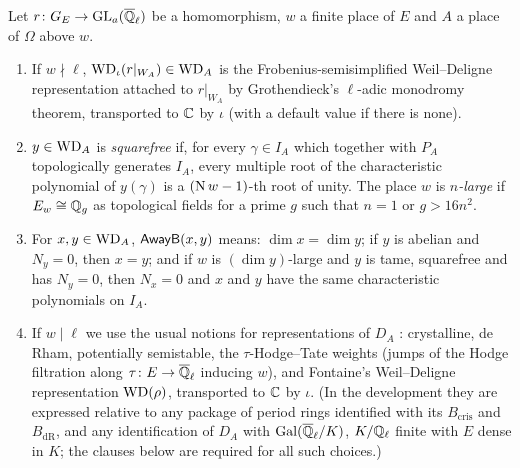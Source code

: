 \begin{definition}\label{def:galois:awayb}
Let $r\colon G_E\to\operatorname{GL}_a(\overline{\mathbb{Q}}_\ell)$ be a homomorphism, $w$ a finite place of $E$ and $A$ a place of
$\Omega$ above $w$.
\begin{enumerate}[label=(\alph*),nosep]
\item If $w\nmid\ell$, $\mathrm{WD}_\iota(r|_{W_A})\in\mathrm{WD}_A$ is the Frobenius-semisimplified
  Weil--Deligne representation attached to $r|_{W_A}$ by Grothendieck's $\ell$-adic monodromy theorem,
  transported to $\mathbb{C}$ by $\iota$ (with a default value if there is none).
\item $y\in\mathrm{WD}_A$ is \emph{squarefree} if, for every $\gamma\in I_A$ which together with $P_A$
  topologically generates $I_A$, every multiple root of the characteristic polynomial of $y(\gamma)$
  is a $(\operatorname{N} w-1)$-th root of unity. The place $w$ is \emph{$n$-large} if $E_w\cong\mathbb{Q}_g$ as topological
  fields for a prime $g$ such that $n=1$ or $g>16n^2$.
\item For $x,y\in\mathrm{WD}_A$, $\mathsf{AwayB}(x,y)$ means: $\dim x=\dim y$; if $y$ is abelian and
  $N_y=0$, then $x=y$; and if $w$ is $(\dim y)$-large and $y$ is tame, squarefree and has $N_y=0$,
  then $N_x=0$ and $x$ and $y$ have the same characteristic polynomials on $I_A$.
\item If $w\mid\ell$ we use the usual notions for representations of $D_A$ \cite{Fontaine1994}:
  crystalline, de Rham, potentially semistable, the $\tau$-Hodge--Tate weights (jumps of the Hodge
  filtration along $\tau\colon E\to\overline{\mathbb{Q}}_\ell$ inducing $w$), and Fontaine's Weil--Deligne representation
  $\mathrm{WD}(\rho)$, transported to $\mathbb{C}$ by $\iota$. (In the development they are expressed relative to
  any package of period rings identified with its $B_{\mathrm{cris}}$ and $B_{\mathrm{dR}}$, and any
  identification of $D_A$ with $\operatorname{Gal}(\overline{\mathbb{Q}}_\ell/K)$, $K/\mathbb{Q}_\ell$ finite with $E$ dense in $K$; the clauses
  below are required for all such choices.)
\end{enumerate}
\end{definition}

